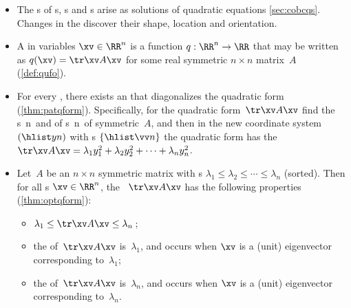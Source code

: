 \begin{itemize}
\itemhi For every real ~\(A\), 
matrix~\(A\) is symmetric iff it is  (\cref{thm:symspec}).

\item The s of s, s and s arise as solutions of quadratic equations \cref{sec:cobcqs}.
Changes in the  discover their shape, location and orientation.

\item A  in variables \(\xv\in\RR^n\) is a function \(q:\RR^n\to\RR\) that may be written as \(q(\xv)=\tr\xv A\xv\) for some real symmetric \(n\times n\) matrix~\(A\) (\cref{def:qufo}).

\item For every , there exists an   that diagonalizes the quadratic form (\cref{thm:patqform}).
Specifically, for the quadratic form~\(\tr\xv A\xv\) find the 
s~\hlist\lambda n\ and  of s~\hlist\vv n\ of symmetric~\(A\), and then in the new coordinate system~\((\hlist yn)\) with s \(\{\hlist\vv n\}\) the quadratic form has the  \(\tr\xv A\xv=\lambda_1y_1^2+\lambda_2y_2^2+\cdots+\lambda_ny_n^2\).

\item Let~\(A\) be an \(n\times n\) symmetric matrix with s \(\lambda_1\leq\lambda_2\leq\cdots\leq\lambda_n\) (sorted). 
Then for all s \(\xv\in\RR^n\), the ~\(\tr\xv A\xv\) has the following properties (\cref{thm:optqform}):
\begin{itemize}
\item \(\lambda_1\leq \tr\xv A\xv\leq\lambda_n\)\,;
\item the  of~\(\tr\xv A\xv\) is~\(\lambda_1\), and occurs when \(\xv\) is a (unit) eigenvector corresponding to~\(\lambda_1\);
\item the  of~\(\tr\xv A\xv\) is~\(\lambda_n\), and occurs when \(\xv\) is a (unit) eigenvector corresponding to~\(\lambda_n\).
\end{itemize}





\end{itemize}





\makeanswers
